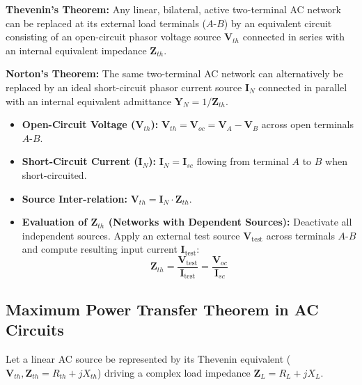 \documentclass[12pt,a4paper]{article}
\begin{document}
\begin{tcolorbox}[defbox, title={\textbf{Thevenin's and Norton's AC Theorems}}]
\textbf{Thevenin's Theorem:} Any linear, bilateral, active two-terminal AC network can be replaced at its external load terminals ($A$-$B$) by an equivalent circuit consisting of an open-circuit phasor voltage source $\mathbf{V}_{th}$ connected in series with an internal equivalent impedance $\mathbf{Z}_{th}$.

\textbf{Norton's Theorem:} The same two-terminal AC network can alternatively be replaced by an ideal short-circuit phasor current source $\mathbf{I}_N$ connected in parallel with an internal equivalent admittance $\mathbf{Y}_N = 1/\mathbf{Z}_{th}$.
\end{tcolorbox}

\begin{tcolorbox}[formulabox, title={\textbf{Analytical Formulation and Evaluation of $\mathbf{V}_{th}, \mathbf{I}_N$ and $\mathbf{Z}_{th}$}}]
\begin{itemize}[leftmargin=*, itemsep=2pt]
  \item \textbf{Open-Circuit Voltage ($\mathbf{V}_{th}$):} $\mathbf{V}_{th} = \mathbf{V}_{oc} = \mathbf{V}_A - \mathbf{V}_B$ across open terminals $A$-$B$.
  \item \textbf{Short-Circuit Current ($\mathbf{I}_N$):} $\mathbf{I}_N = \mathbf{I}_{sc}$ flowing from terminal $A$ to $B$ when short-circuited.
  \item \textbf{Source Inter-relation:} $\mathbf{V}_{th} = \mathbf{I}_N \cdot \mathbf{Z}_{th}$.
  \item \textbf{Evaluation of $\mathbf{Z}_{th}$ (Networks with Dependent Sources):} Deactivate all independent sources. Apply an external test source $\mathbf{V}_{\text{test}}$ across terminals $A$-$B$ and compute resulting input current $\mathbf{I}_{\text{test}}$:
  \begin{equation}
    \mathbf{Z}_{th} = \frac{\mathbf{V}_{\text{test}}}{\mathbf{I}_{\text{test}}} = \frac{\mathbf{V}_{oc}}{\mathbf{I}_{sc}}
  \end{equation}
\end{itemize}
\end{tcolorbox}

\subsection{Maximum Power Transfer Theorem in AC Circuits}
Let a linear AC source be represented by its Thevenin equivalent ($\mathbf{V}_{th}, \mathbf{Z}_{th} = R_{th} + jX_{th}$) driving a complex load impedance $\mathbf{Z}_L = R_L + jX_L$.
\end{document}
